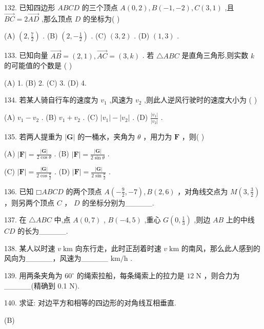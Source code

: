 \documentclass[10pt]{article}
\begin{document}
132. 已知四边形 \({ABCD}\) 的三个顶点 \(A\left( {0,2}\right) ,B\left( {-1, - 2}\right) ,C\left( {3,1}\right)\) ,且 \(\overrightarrow{BC} = 2\overrightarrow{AD}\) ,那么顶点 \(D\) 的坐标为( )

(A) \(\left( {2,\frac{7}{2}}\right)\) . (B) \(\left( {2, - \frac{1}{2}}\right)\) . (C) \(\left( {3,2}\right)\) . (D) \(\left( {1,3}\right)\) .

133. 已知向量 \(\overrightarrow{AB} = \left( {2,1}\right) ,\overrightarrow{AC} = \left( {3,k}\right)\) . 若 \(\bigtriangleup {ABC}\) 是直角三角形,则实数 \(k\) 的可能值的个数是 ( )

(A) 1. (B) 2. (C) 3. (D) 4.

134. 若某人骑自行车的速度为 \({v}_{1}\) ,风速为 \({v}_{2}\) ,则此人逆风行驶时的速度大小为 ( )

(A) \({v}_{1} - {v}_{2}\) . (B) \({v}_{1} + {v}_{2}\) . (C) \(\left| {v}_{1}\right|  - \left| {v}_{2}\right|\) . (D) \(\frac{\left| {v}_{1}\right| }{\left| {v}_{2}\right| }\) .

135. 若两人提重为 \(\left| \mathbf{G}\right|\) 的一桶水，夹角为 \(\theta\) ，用力为 \(\mathbf{F}\) ，则( )

(A) \(\left| \mathbf{F}\right|  = \frac{\left| \mathbf{G}\right| }{2\cos \theta }\) . (B) \(\left| \mathbf{F}\right|  = \frac{\left| \mathbf{G}\right| }{2\sin \theta }\) .

(C) \(\left| \mathbf{F}\right|  = \frac{\left| \mathbf{G}\right| }{2\cos \frac{\theta }{2}}\) . (D) \(\left| \mathbf{F}\right|  = \frac{\left| \mathbf{G}\right| }{2\sin \frac{\theta }{2}}\) .

136. 已知 \(□ {ABCD}\) 的两个顶点 \(A\left( {-\frac{9}{2}, - 7}\right) ,B\left( {2,6}\right)\) ，对角线交点为 \(M\left( {3,\frac{3}{2}}\right)\) ，则另两个顶点 \(C\) ， \(D\) 的坐标分别为\_\_\_\_\_.

137. 在 \(\bigtriangleup {ABC}\) 中,点 \(A\left( {0,7}\right)\) , \(B\left( {-4,5}\right)\) ,重心 \(G\left( {0,\frac{1}{3}}\right)\) ,则边 \({AB}\) 上的中线 \({CD}\) 的长为\_\_\_\_\_.

138. 某人以时速 \(v\mathrm{\;{km}}\) 向东行走，此时正刮着时速 \(v\mathrm{\;{km}}\) 的南风，那么此人感到的风向为\_\_\_\_\_，风速为\_\_\_\_\_ \(\mathrm{{km}}/\mathrm{h}\) .

139. 用两条夹角为 \({60}^{ \circ  }\) 的绳索拉船，每条绳索上的拉力是 \({12}\mathrm{\;N}\) ，则合力为\_\_\_\_\_(精确到 0.1 N).

140. 求证: 对边平方和相等的四边形的对角线互相垂直.

(B)
\end{document}
